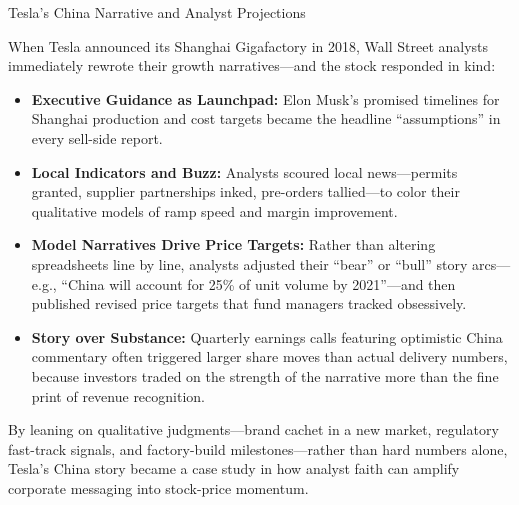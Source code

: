 \begin{HistoricalSidebar}{Tesla’s China Narrative and Analyst Projections}

  When Tesla announced its Shanghai Gigafactory in 2018, Wall Street analysts immediately rewrote their growth 
  narratives—and the stock responded in kind:

  \medskip
  
  \begin{itemize}
    \item \textbf{Executive Guidance as Launchpad:}  Elon Musk’s promised timelines for Shanghai production and 
    cost targets became the headline “assumptions” in every sell-side report.

    \medskip

    \item \textbf{Local Indicators and Buzz:}  Analysts scoured local news—permits granted, supplier partnerships 
    inked, pre-orders tallied—to color their qualitative models of ramp speed and margin improvement.

    \medskip

    \item \textbf{Model Narratives Drive Price Targets:}  Rather than altering spreadsheets line by line, analysts 
    adjusted their “bear” or “bull” story arcs—e.g., “China will account for 25\% of unit volume by 2021”—and then 
    published revised price targets that fund managers tracked obsessively.

    \medskip

    \item \textbf{Story over Substance:}  Quarterly earnings calls featuring optimistic China commentary often 
    triggered larger share moves than actual delivery numbers, because investors traded on the strength of the 
    narrative more than the fine print of revenue recognition.

  \end{itemize}

  \medskip
  
  By leaning on qualitative judgments—brand cachet in a new market, regulatory fast-track signals, and factory-build 
  milestones—rather than hard numbers alone, Tesla’s China story became a case study in how analyst faith can amplify 
  corporate messaging into stock-price momentum.  

\end{HistoricalSidebar}

\medskip


